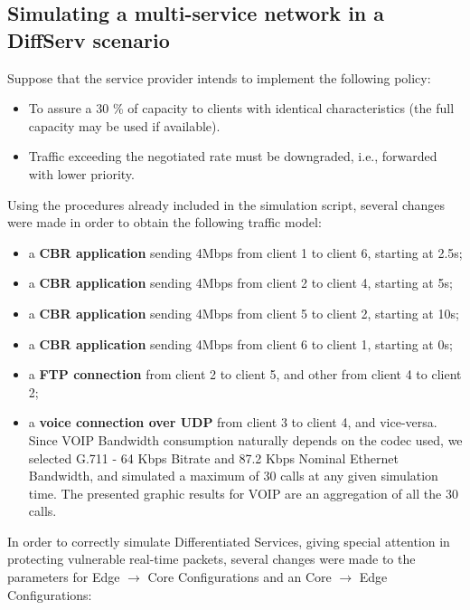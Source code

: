\documentclass[conference,compsoc]{IEEEtran}
\begin{document}
 \subsection{Simulating a multi-service network in a DiffServ scenario}
  Suppose that the service provider intends to implement the following policy:
  \begin{itemize}
  \item To assure a 30 \% of capacity to clients with identical characteristics (the full capacity may be
used if available).
  \item Traffic exceeding the negotiated rate must be downgraded, i.e., forwarded with lower priority.
  \end{itemize}
  Using the procedures already included in the simulation script, several changes were made in order to obtain the following traffic model:
   \begin{itemize}
     \item a \textbf{CBR application} sending 4Mbps from client 1 to client 6, starting at 2.5s;
          \item a \textbf{CBR application} sending 4Mbps from client 2 to client 4, starting at 5s;
          \item a \textbf{CBR application} sending 4Mbps from client 5 to client 2, starting at 10s;
              \item a \textbf{CBR application} sending 4Mbps from client 6 to client 1, starting at 0s;
     \item  a \textbf{FTP connection} from client 2 to client 5, and other from client 4 to client 2;
     \item  a \textbf{voice connection over UDP} from client 3 to client 4, and vice-versa. Since VOIP Bandwidth consumption naturally depends on the codec used, we selected G.711 - 64 Kbps Bitrate and 87.2 Kbps Nominal Ethernet Bandwidth, and simulated a maximum of 30 calls at any given simulation time. The presented graphic results for VOIP are an aggregation of all the 30 calls. 
     \end{itemize}
\par 
In order to correctly simulate Differentiated Services, giving special attention in protecting vulnerable real-time packets, several changes were made to the parameters for  Edge $\rightarrow$  Core Configurations and an Core $\rightarrow$  Edge Configurations:
\end{document}
